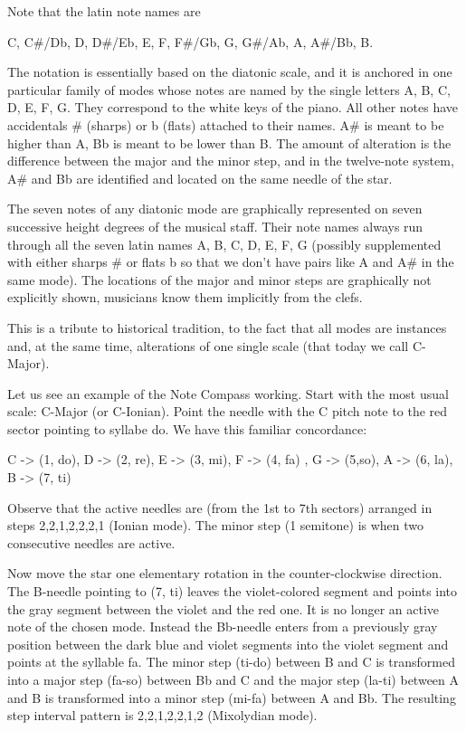 Note that the latin note names are 

C, C\#/Db, D, D\#/Eb, E, F, F\#/Gb, G, G\#/Ab, A, A\#/Bb, B.

The notation is essentially based on the diatonic scale, and it is anchored in one particular family of modes whose notes are named  by the single letters  A, B, C, D, E, F, G. They correspond to the white keys of the piano. All other  notes have accidentals \# (sharps) or b (flats) attached to their  names. A\# is meant to be higher than A,  Bb is meant to be lower than B. The amount of alteration is the difference between the major and the minor step, and in the twelve-note system, A\# and Bb are identified and located on the same needle of the star. 

The seven notes of any diatonic mode are graphically represented on seven successive height degrees of the musical staff. Their note names always run through all the seven latin names A, B, C, D, E, F, G (possibly supplemented with either sharps \# or flats b so that we don't have pairs like A and A\# in the same mode). The locations of the major and minor steps are graphically not explicitly shown, musicians know them implicitly from the clefs.

This is a tribute to historical tradition, to the fact that all modes are instances and, at the same time, alterations of one single scale (that today we call C-Major). 

Let us see an example of the Note Compass working. Start with the most usual scale: C-Major (or C-Ionian). Point the needle with the C pitch note to the red sector pointing to syllabe do. We have this familiar concordance:

C -> (1, do), D -> (2, re), E -> (3, mi), F -> (4, fa) , G -> (5,so), A -> (6, la), B -> (7, ti)  

Observe that the active needles are (from the 1st to 7th sectors) arranged in steps  2,2,1,2,2,2,1 (Ionian mode). The minor step (1 semitone) is when two consecutive needles are active. 

Now move the star one elementary rotation in the counter-clockwise direction. The B-needle pointing to (7, ti) leaves the violet-colored segment and points into the gray segment between the violet and the red one. It is no longer an active note of the chosen mode. Instead the Bb-needle enters from a previously gray position between the dark blue and violet segments into the violet segment and points at the syllable fa. The minor step (ti-do) between B and C is transformed into a major step (fa-so) between Bb and C and the major step (la-ti) between A and B is transformed into a minor step (mi-fa) between A and Bb. The resulting step interval pattern is 2,2,1,2,2,1,2 (Mixolydian mode).


